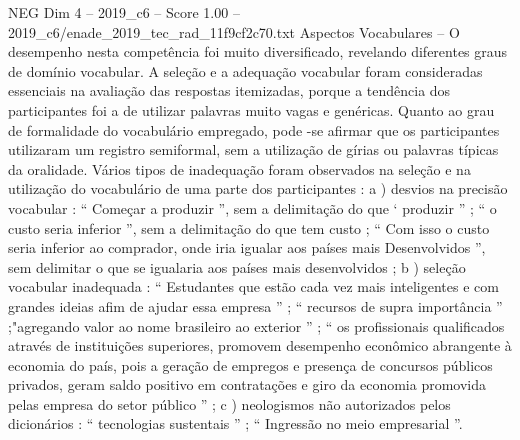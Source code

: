\begin{textsample}{NEG Dim 4 – 2019\_c6 – Score 1.00 – 2019\_c6/enade\_2019\_tec\_rad\_11f9cf2c70.txt}
Aspectos Vocabulares – O desempenho nesta competência foi muito diversificado, revelando diferentes graus de domínio vocabular.
A seleção e a adequação vocabular foram consideradas essenciais na avaliação das respostas itemizadas, porque a tendência dos participantes foi a de utilizar palavras muito vagas e genéricas.
Quanto ao grau de formalidade do vocabulário empregado, pode -se afirmar que os participantes utilizaram um registro semiformal, sem a utilização de gírias ou palavras típicas da oralidade.
Vários tipos de inadequação foram observados na seleção e na utilização do vocabulário de uma parte dos participantes : a ) desvios na precisão vocabular : “ Começar a produzir ”, sem a delimitação do que ‘ produzir ” ; “ o custo seria inferior ”, sem a delimitação do que tem custo ; “ Com isso o custo seria inferior ao comprador, onde iria igualar aos países mais Desenvolvidos ”, sem delimitar o que se igualaria aos países mais desenvolvidos ; b ) seleção vocabular inadequada : “ Estudantes que estão cada vez mais inteligentes e com grandes ideias afim de ajudar essa empresa ” ; “ recursos de supra importância ” ;"agregando valor ao nome brasileiro ao exterior ” ; “ os profissionais qualificados através de instituições superiores, promovem desempenho econômico abrangente à economia do país, pois a geração de empregos e presença de concursos públicos privados, geram saldo positivo em contratações e giro da economia promovida pelas empresa do setor público ” ; c ) neologismos não autorizados pelos dicionários : “ tecnologias sustentais ” ; “ Ingressão no meio empresarial ”.

\end{textsample}
